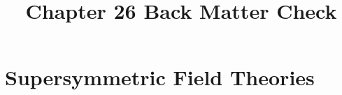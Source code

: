 \documentclass[11pt,a4paper]{article}
\title{Chapter 26 Back Matter Check}
\author{}
\numberwithin{equation}{subsection}
\begin{document}
\maketitle
\setcounter{section}{25}
\section{Supersymmetric Field Theories}

\end{document}
